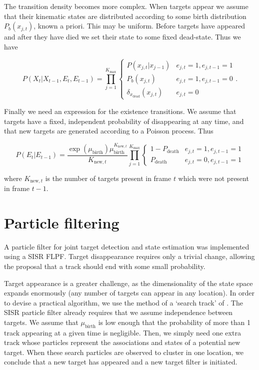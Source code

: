 The transition density becomes more complex. When targets appear we assume that their kinematic states are distributed according to some birth distribution $P_b(x_{j,t})$, known a priori. This may be uniform. Before targets have appeared and after they have died we set their state to some fixed dead-state. Thus we have

\begin{equation}
P(X_t|X_{t-1}, E_t, E_{t-1}) = \prod_{j=1}^{K_{\max}} \begin{cases} P(x_{j,t}|x_{j-1}) & e_{j,t} = 1, e_{j,t-1} = 1 \\ P_b(x_{j,t}) & e_{j,t} = 1, e_{j,t-1} = 0 \\ \delta_{x_{\text{dead}}}(x_{j,t}) & e_{j,t} = 0 \end{cases}.
\label{eq:MTFactorisedTransitionWithE}
\end{equation}

Finally we need an expression for the existence transitions. We assume that targets have a fixed, independent probability of disappearing at any time, and that new targets are generated according to a Poisson process. Thus

\begin{equation}
P(E_t|E_{t-1}) = \frac{ \exp(\mu_{\text{birth}}) \mu_{\text{birth}}^{K_{\text{new},t}} }{ K_{\text{new},t} } \prod_{j=1}^{K_{\max}} \begin{cases} 1-P_{\text{death}} & e_{j,t} = 1, e_{j,t-1} = 1 \\ P_{\text{death}} & e_{j,t} = 0, e_{j,t-1} = 1 \end{cases}
\label{eq:MTExistenceTransition}
\end{equation}

where $K_{\text{new},t}$ is the number of targets present in frame $t$ which were not present in frame $t-1$.



\section{Particle filtering}
A particle filter for joint target detection and state estimation was implemented using a SISR FLPF. Target disappearance requires only a trivial change, allowing the proposal that a track should end with some small probability.

Target appearance is a greater challenge, as the dimensionality of the state space expands enormously (any number of targets can appear in any location). In order to devise a practical algorithm, we use the method of a `search track' of \cite{Horridge2009}. The SISR particle filter already requires that we assume independence between targets. We assume that $\mu_{\text{birth}}$ is low enough that the probability of more than 1 track appearing at a given time is negligible. Then, we simply need one extra track whose particles represent the associations and states of a potential new target. When these search particles are observed to cluster in one location, we conclude that a new target has appeared and a new target filter is initiated.


